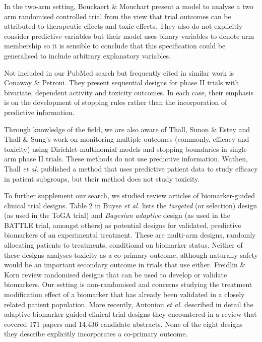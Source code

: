 \documentclass{article}
\begin{document}
In the two-arm setting, Bouckaert \& Mouchart\cite{Bouckaert2001} present a model to analyse a two arm randomised controlled trial from the view that trial outcomes can be attributed to therapeutic effects and toxic effects.
They also do not explicitly consider predictive variables but their model uses binary variables to denote arm membership so it is sensible to conclude that this specification could be generalised to include arbitrary explanatory variables.

Not included in our PubMed search but frequently cited in similar work is Conaway \& Petroni\cite{Conaway1995, Conaway1996}.
They present sequential designs for phase II trials with bivariate, dependent activity and toxicity outcomes.
In each case, their emphasis is on the development of stopping rules rather than the incorporation of predictive information.

Through knowledge of the field, we are also aware of Thall, Simon \& Estey\cite{Thall1995, Thall1996a} and Thall \& Sung's\cite{Thall1998} work on monitoring multiple outcomes (commonly, efficacy and toxicity) using Dirichlet-multinomial models and stopping boundaries in single arm phase II trials.
These methods do not use predictive information.
Wathen, Thall \textit{et al.}\cite{Wathen2008} published a method that uses predictive patient data to study efficacy in patient subgroups, but their method does not study toxicity.

To further supplement our search, we studied review articles of biomarker-guided clinical trial designs.
Table 2 in Buyse \textit{et al.}\cite{Buyse2011} lists the \textit{targeted} (or selection) design (as used in the ToGA trial\cite{Bang2010}) and \textit{Bayesian adaptive} design (as used in the BATTLE trial\cite{Kim2011}, amongst others) as potential designs for validated, predictive biomarkers of an experimental treatment.
These are multi-arm designs, randomly allocating patients to treatments, conditional on biomarker status.
Neither of these designs analyses toxicity as a co-primary outcome, although naturally safety would be an important secondary outcome in trials that use either.
Freidlin \& Korn\cite{Freidlin2010} review randomised designs that can be used to develop or validate biomarkers.
Our setting is non-randomised and concerns studying the treatment modification effect of a biomarker that has already been validated in a closely related patient population.
More recently, Antoniou \textit{et al.}\cite{Antoniou2016} described in detail the adaptive biomarker-guided clinical trial designs they encountered in a review that covered 171 papers and 14,436 candidate abstracts.
None of the eight designs they describe explicitly incorporates a co-primary outcome.
\end{document}

